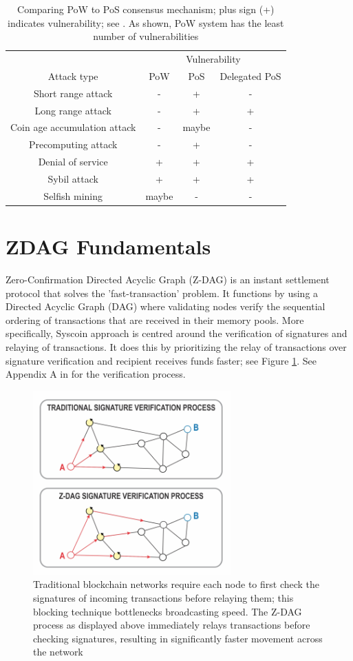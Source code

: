 \documentclass[peerreview]{ieeesyscoin}
\begin{document}
\begin{table}[h!]
\centering
\begin{tabular}{ |c|c|c|c| } 
\hline
 & \multicolumn{3}{|c|}{ Vulnerability } \\
 Attack type & PoW & PoS & Delegated PoS \\
\hline
Short range attack & - & + & - \\
Long range attack & - & + & + \\
Coin age accumulation attack & - & maybe & - \\
Precomputing attack & - & + & - \\
Denial of service & + & + & + \\
Sybil attack & + & + & + \\
Selfish mining & maybe & - & - \\
\hline
\end{tabular}
\caption{Comparing PoW to PoS consensus mechanism; plus sign (+) indicates vulnerability; see \cite{Bit15}. As shown, PoW system has the least number of vulnerabilities}
\label{table:pow_vs_pos}
\end{table}

\section{ZDAG Fundamentals}

Zero-Confirmation Directed Acyclic Graph (Z-DAG) is an instant settlement protocol that solves the 'fast-transaction' problem. It functions by using a Directed Acyclic Graph (DAG) where validating nodes verify the sequential ordering of transactions that are received in their memory pools. More specifically, Syscoin approach is centred around the verification of signatures and relaying of transactions. It does this by prioritizing the relay of transactions over signature verification and recipient receives funds faster; see Figure \ref{fig:dag_tx}. See Appendix A in \cite{Sidb18} for the verification process.

\begin{figure}[h!]
\includegraphics[width=3in]{img/dag_tx.png}
\caption{Traditional blockchain networks require each node to first check the signatures of incoming transactions before relaying them; this blocking technique bottlenecks broadcasting speed. The Z-DAG process as displayed above immediately relays transactions before checking signatures, resulting in significantly faster movement across the network} 
\label{fig:dag_tx}
\end{figure} 
\end{document}
